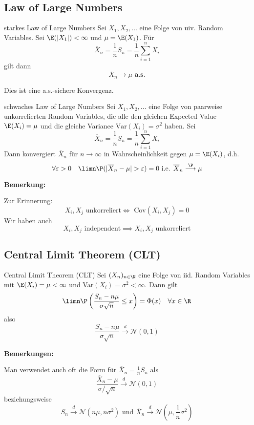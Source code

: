 \subsection{Law of Large Numbers}
\begin{mainbox}{starkes Law of Large Numbers}
    Sei $X_1, X_2, \ldots$ eine Folge von uiv. Random Variables. Sei $\E(|X_1|)<\infty$ und $\mu = \E(X_1)$. Für
    $$\overline{X}_n = \frac{1}{n}S_n = \frac{1}{n}\sum_{i = 1}^{n}X_i$$
    gilt dann
    $$\overline{X}_n \longrightarrow \mu \textbf{ a.s.}$$
\end{mainbox}
Dies ist eine a.s.-sichere Konvergenz.
\begin{mainbox}{schwaches Law of Large Numbers}
    Sei $X_1, X_2, ...$ eine Folge von paarweise unkorrelierten Random Variables, die alle den gleichen Expected Value $\E(X_i) = \mu$ und die gleiche Variance $\text{Var}(X_i) = \sigma^2$ haben.
    Sei 
    $$\overline{X}_n = \frac{1}{n}S_n = \frac{1}{n}\sum_{i = 1}^{n}X_i$$
    Dann konvergiert $\overline{X}_n$ für $n \to \infty$ in Wahrscheinlichkeit gegen $\mu = \E(X_i)$, d.h.
    $$\forall \varepsilon > 0 \quad \limn \P(|\overline{X}_n - \mu| > \varepsilon) = 0 \text{ i.e. } \overline{X}_n \overset{\P}{\longrightarrow} \mu$$
\end{mainbox}
\textbf{Bemerkung: }

Zur Erinnerung: 
$$X_i, X_j \text{ unkorreliert} \iff \text{ Cov}(X_i, X_j) = 0$$
Wir haben auch 
$$X_i, X_j \text{ independent} \implies X_i, X_j \text{ unkorreliert}$$

\subsection{Central Limit Theorem (CLT)}
\begin{mainbox}{Central Limit Theorem (CLT)}
    Sei $(X_n)_{n\in \N}$ eine Folge von iid. Random Variables mit $\E(X_i) = \mu < \infty$ und Var$(X_i) = \sigma^2 < \infty$.
    Dann gilt 
    $$\limn \P\left(\frac{S_n - n \mu}{\sigma \sqrt{n}} \leq x\right) = \Phi(x) \quad \forall x \in \R$$
    also
    $$\frac{S_n - n \mu}{\sigma \sqrt{n}} \overset{d}{\longrightarrow} \mathcal{N}(0,1)$$
\end{mainbox}
\textbf{Bemerkungen: }

Man verwendet auch oft die Form für $\overline{X}_n = \frac{1}{n}S_n$ als
$$\frac{\overline{X}_n - \mu}{\sigma / \sqrt{n}} \overset{d}{\longrightarrow} \mathcal{N}(0,1)$$
beziehungsweise
$$S_n \overset{d}{\longrightarrow} \mathcal{N}(n\mu, n \sigma^2) \text{ und } \overline{X}_n \overset{d}{\longrightarrow} \mathcal{N}\left(\mu, \frac{1}{n}\sigma^2\right)$$
